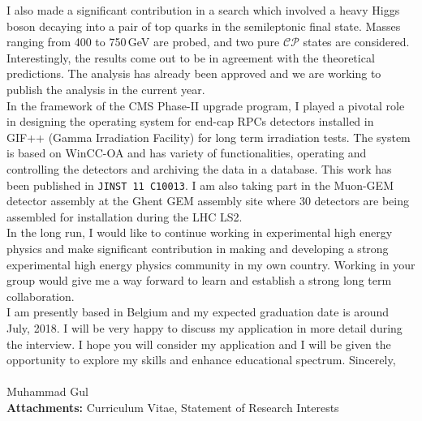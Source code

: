 \documentclass[]{article}
\begin{document}
\noindent I also made a significant contribution in a search which involved a heavy Higgs boson decaying into a pair of top quarks in the semileptonic final state. Masses ranging from 400 to 750\,GeV are probed, and two pure $\mathcal{CP}$ states are considered. Interestingly, the results come out to be in agreement with the theoretical predictions. The analysis has already been approved and we are working to publish the analysis in the current year.\\

\noindent In the framework of the CMS Phase-II upgrade program, I played a pivotal role in designing the operating system for end-cap RPCs detectors installed in GIF++ (Gamma Irradiation Facility) for long term irradiation tests. The system is based on WinCC-OA and has variety of functionalities, operating and controlling the detectors and archiving the data in a database. This work has been published in \texttt{JINST 11 C10013}. I am also taking part in the Muon-GEM detector assembly at the Ghent GEM assembly site where 30 detectors are being assembled for installation during the LHC LS2.\\

\noindent In the long run, I would like to continue working in experimental high energy physics and make significant contribution in making and developing a strong experimental high energy physics community in my own country. Working in your group would give me a way forward to learn and establish a strong long term collaboration.\\

\noindent I am presently based in Belgium and my expected graduation date is around July, 2018. I will be very happy to discuss my application in more detail during the interview. I hope you will consider my application and I will be given the opportunity to explore my skills and enhance educational spectrum.
\newline 
\newline
Sincerely,\\
\\
Muhammad Gul\\

\noindent \textbf{Attachments:} Curriculum Vitae, Statement of Research Interests 
\end{document}
